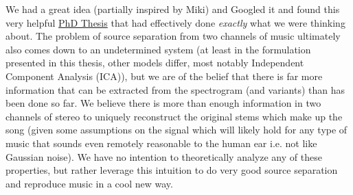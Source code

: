 \documentclass[paper=a4, fontsize=11pt]{scrartcl} %
\numberwithin{equation}{section} %
\numberwithin{figure}{section} %
\numberwithin{table}{section} %
\begin{document}
We had a great idea (partially inspired by Miki) and Googled it and found this very helpful \href{http://theses.eurasip.org/media/theses/documents/cobos-maximo-application-of-sound-source-separation-methods-to-advanced-spatial-audio-systems.pdf}{PhD Thesis} that had effectively done {\it exactly} what we were thinking about. The problem of source separation from two channels of music ultimately also comes down to an undetermined system (at least in the formulation presented in this thesis, other models differ, most notably Independent Component Analysis (ICA)), but we are of the belief that there is far more information that can be extracted from the spectrogram (and variants) than has been done so far. We believe there is more than enough information in two channels of stereo to uniquely reconstruct the original stems which make up the song (given some assumptions on the signal which will likely hold for any type of music that sounds even remotely reasonable to the human ear i.e. not like Gaussian noise). We have no intention to theoretically analyze any of these properties, but rather leverage this intuition to do very good source separation and reproduce music in a cool new way.
\end{document}
